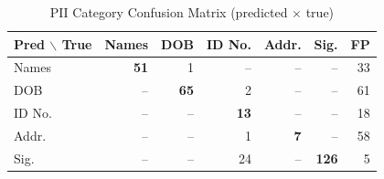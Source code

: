 \begin{table}[h]\centering
\caption{PII Category Confusion Matrix (predicted $\times$ true)}
\label{tab:confusion}
\footnotesize
\setlength{\tabcolsep}{4pt}
\begin{tabular}{lrrrrrr}
\toprule
Pred $\backslash$ True & Names & DOB & ID No. & Addr. & Sig. & FP \\
\midrule
Names & \textbf{51} & 1 & -- & -- & -- & 33 \\
DOB & -- & \textbf{65} & 2 & -- & -- & 61 \\
ID No. & -- & -- & \textbf{13} & -- & -- & 18 \\
Addr. & -- & -- & 1 & \textbf{7} & -- & 58 \\
Sig. & -- & -- & 24 & -- & \textbf{126} & 5 \\
\bottomrule
\end{tabular}
\end{table}